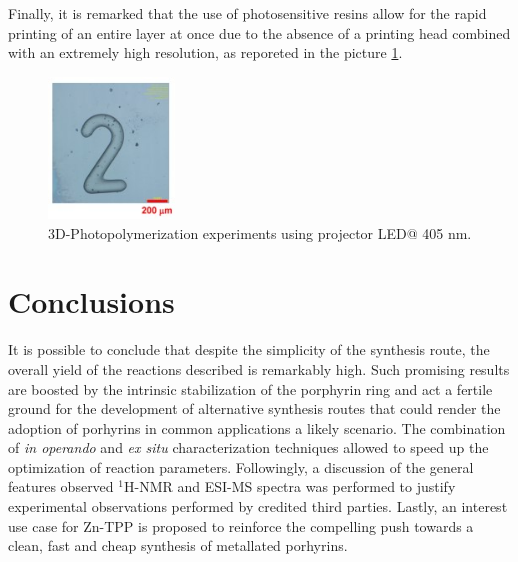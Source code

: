 \documentclass[twoside,twocolumn,9pt]{article}
\begin{document}
Finally, it is remarked that the use of photosensitive resins allow for the rapid printing of an entire layer at once due to the absence of a printing head combined with an extremely high resolution, as reporeted in the picture \ref{print}.
\begin{figure}
	\centering
	\includegraphics[width=0.3\textwidth]{printed}
	\caption{3D-Photopolymerization experiments using projector LED@ 405 nm.}
	\label{print}
\end{figure}
\section{Conclusions}
It is possible to conclude that despite the simplicity of the synthesis route, the overall yield of the reactions described is remarkably high.
Such promising results are boosted by the intrinsic stabilization of the porphyrin ring and act a fertile ground for the development of alternative synthesis routes that could render the adoption of porhyrins in common applications a likely scenario.
The combination of \textit{in operando} and \textit{ex situ} characterization techniques allowed to speed up the optimization of reaction parameters.
Followingly, a discussion of the general features observed $^{1}$H-NMR and ESI-MS spectra was performed to justify experimental observations performed by credited third parties.
Lastly, an interest use case for Zn-TPP is proposed to reinforce the compelling push towards a clean, fast and cheap synthesis of metallated porhyrins.
\end{document}
